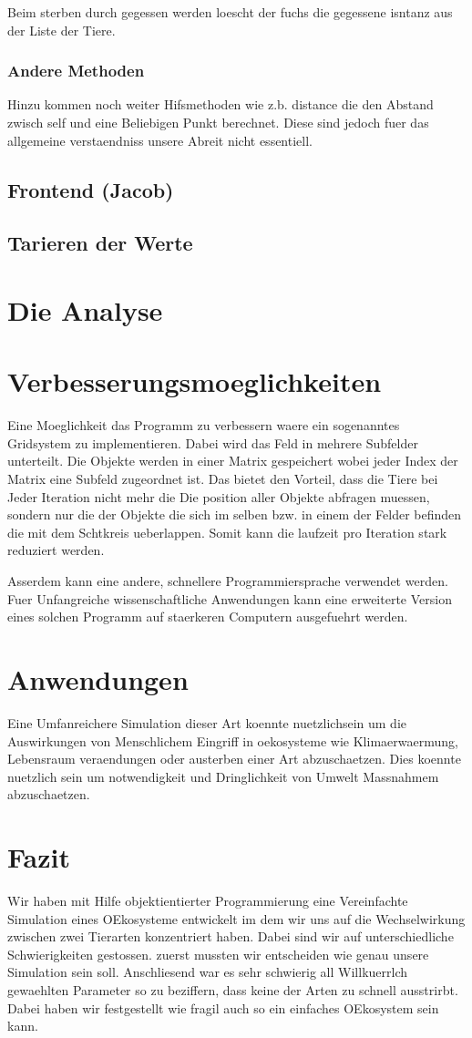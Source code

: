 \documentclass[12pt]{article}
\begin{document}
Beim sterben durch gegessen werden loescht der fuchs die gegessene isntanz aus der Liste der Tiere.
\subsubsection{Andere Methoden}
Hinzu kommen noch weiter Hifsmethoden wie z.b. distance die den Abstand zwisch self und eine Beliebigen Punkt berechnet.
Diese sind jedoch fuer das allgemeine verstaendniss unsere Abreit nicht essentiell.
\subsection{Frontend (Jacob)}
\subsection{Tarieren der Werte}
\section{Die Analyse}
\section{Verbesserungsmoeglichkeiten}
Eine Moeglichkeit das Programm zu verbessern waere ein sogenanntes Gridsystem zu implementieren.
Dabei wird das Feld in mehrere Subfelder unterteilt.
Die Objekte werden in einer Matrix gespeichert wobei jeder Index der Matrix eine Subfeld zugeordnet ist.
Das bietet den Vorteil, dass die Tiere bei Jeder Iteration nicht mehr die Die position aller Objekte abfragen muessen, sondern nur die der Objekte die sich im selben bzw. in einem der Felder befinden die mit dem Schtkreis ueberlappen.
Somit kann die laufzeit pro Iteration stark reduziert werden.

Asserdem kann eine andere, schnellere Programmiersprache verwendet werden.
Fuer Unfangreiche wissenschaftliche Anwendungen kann eine erweiterte Version eines solchen Programm auf staerkeren Computern ausgefuehrt werden.
\section{Anwendungen}
Eine Umfanreichere Simulation dieser Art koennte nuetzlichsein um die Auswirkungen von Menschlichem Eingriff in oekosysteme wie Klimaerwaermung, Lebensraum veraendungen oder austerben einer Art abzuschaetzen.
Dies koennte nuetzlich sein um notwendigkeit und Dringlichkeit von Umwelt Massnahmem abzuschaetzen.
\section{Fazit}
Wir haben mit Hilfe objektientierter Programmierung eine Vereinfachte Simulation eines OEkosysteme entwickelt im dem wir uns auf die Wechselwirkung zwischen zwei Tierarten konzentriert haben.
Dabei sind wir auf unterschiedliche Schwierigkeiten gestossen.
zuerst mussten wir entscheiden wie genau unsere Simulation sein soll.
Anschliesend war es sehr schwierig all Willkuerrlch gewaehlten Parameter so zu beziffern, dass keine der Arten zu schnell ausstrirbt.
Dabei haben wir festgestellt wie fragil auch so ein einfaches OEkosystem sein kann.
\end{document}
